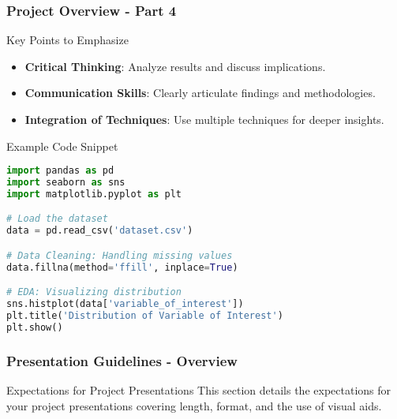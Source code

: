 \documentclass[aspectratio=169]{beamer}
\begin{document}
\begin{frame}[fragile]
    \frametitle{Project Overview - Part 4}

    \begin{block}{Key Points to Emphasize}
        \begin{itemize}
            \item \textbf{Critical Thinking}: Analyze results and discuss implications.
            \item \textbf{Communication Skills}: Clearly articulate findings and methodologies.
            \item \textbf{Integration of Techniques}: Use multiple techniques for deeper insights.
        \end{itemize}
    \end{block}
    
    \begin{block}{Example Code Snippet}
    \begin{lstlisting}[language=Python]
import pandas as pd
import seaborn as sns
import matplotlib.pyplot as plt

# Load the dataset
data = pd.read_csv('dataset.csv')

# Data Cleaning: Handling missing values
data.fillna(method='ffill', inplace=True)

# EDA: Visualizing distribution
sns.histplot(data['variable_of_interest'])
plt.title('Distribution of Variable of Interest')
plt.show()
    \end{lstlisting}
    \end{block}
\end{frame}

\begin{frame}[fragile]
    \frametitle{Presentation Guidelines - Overview}
    \begin{block}{Expectations for Project Presentations}
    This section details the expectations for your project presentations covering length, format, and the use of visual aids.
    \end{block}
\end{frame}
\end{document}
